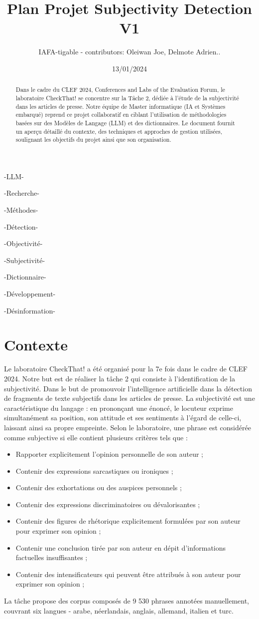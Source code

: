\documentclass[11pt]{rapport_class}
\title{Plan Projet Subjectivity Detection V1}
\author{IAFA-tigable - contributors: Oleiwan Joe, Delmote Adrien..}
\date{13/01/2024}
\begin{document}
\maketitle

\begin{abstract}
Dans le cadre du CLEF 2024, Conferences and Labs of the Evaluation Forum, le laboratoire CheckThat! se concentre sur la Tâche 2, dédiée à l'étude de la subjectivité dans les articles de presse. Notre équipe de Master informatique (IA et Systèmes embarqué) reprend ce projet collaboratif en ciblant l'utilisation de méthodologies basées sur des Modèles de Langage (LLM) et des dictionnaires. Le document fournit un aperçu détaillé du contexte, des techniques et approches de gestion utilisées, soulignant les objectifs du projet ainsi que son organisation.
\end{abstract}

\smallskip
\begin{motsclefs}
\smallskip
\centerline{-LLM-}
\centerline{-Recherche-}
\centerline{-Méthodes-}
\centerline{-Détection-}
\centerline{-Objectivité-}
\centerline{-Subjectivité-}
\centerline{-Dictionnaire-}
\centerline{-Développement-}
\centerline{-Désinformation-}
\end{motsclefs}

\tableofcontents

\chapter{Contexte}
Le laboratoire CheckThat! a été organisé pour la 7e fois dans le cadre de CLEF 2024. Notre but est de réaliser la tâche 2 qui consiste à l’identification de la subjectivité. Dans le but de promouvoir l’intelligence artificielle dans la détection de fragments de texte subjectifs dans les articles de presse. La subjectivité est une caractéristique du langage : en prononçant une énoncé, le locuteur exprime simultanément sa position, son attitude et ses sentiments à l'égard de celle-ci, laissant ainsi sa propre empreinte. Selon le laboratoire, une phrase est considérée comme subjective si elle contient plusieurs critères tels que :
\begin{itemize}
    \item Rapporter explicitement l'opinion personnelle de son auteur ;
    \item Contenir des expressions sarcastiques ou ironiques ;
    \item Contenir des exhortations ou des auspices personnels ;
    \item Contenir des expressions discriminatoires ou dévalorisantes ;
    \item Contenir des figures de rhétorique explicitement formulées par son auteur pour exprimer son opinion ;
    \item Contenir une conclusion tirée par son auteur en dépit d'informations factuelles insuffisantes ;
    \item Contenir des intensificateurs qui peuvent être attribués à son auteur pour exprimer son opinion ;
\end{itemize}
La tâche propose des corpus composés de 9 530 phrases annotées manuellement, couvrant six langues - arabe, néerlandais, anglais, allemand, italien et turc.
\end{document}
